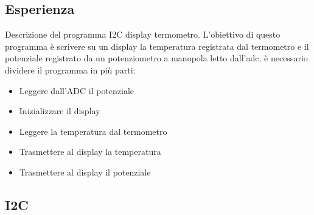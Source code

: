 \documentclass[main.tex]{subfiles}
\begin{document}
\subsection{Esperienza}

Descrizione del programma I2C display termometro. 
L'obiettivo di questo programma è scrivere su un display la temperatura registrata dal termometro e 
il potenziale registrato da un potenziometro a manopola letto dall'adc.
è necessario dividere il programma in più parti:
\begin{itemize}
    \item Leggere dall'ADC il potenziale
    \item Inizializzare il display
    \item Leggere la temperatura dal termometro
    \item Trasmettere al display la temperatura
    \item Trasmettere al display il potenziale
\end{itemize}

\subsection{I2C}
\end{document}
